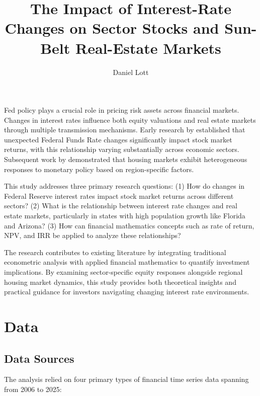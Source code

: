 \documentclass[12pt, stu, abstract]{apa7}
\title{The Impact of Interest-Rate Changes on Sector Stocks and Sun-Belt Real-Estate Markets}
\author{Daniel Lott}
\begin{document}
\maketitle

Fed policy plays a crucial role in pricing risk assets across financial markets. Changes in interest rates influence both equity valuations and real estate markets through multiple transmission mechanisms. Early research by \textcite{bernanke2005} established that unexpected Federal Funds Rate changes significantly impact stock market returns, with this relationship varying substantially across economic sectors. Subsequent work by \textcite{giuliodori2005} demonstrated that housing markets exhibit heterogeneous responses to monetary policy based on region-specific factors.

This study addresses three primary research questions: (1) How do changes in Federal Reserve interest rates impact stock market returns across different sectors? (2) What is the relationship between interest rate changes and real estate markets, particularly in states with high population growth like Florida and Arizona? (3) How can financial mathematics concepts such as rate of return, NPV, and IRR be applied to analyze these relationships?

The research contributes to existing literature by integrating traditional econometric analysis with applied financial mathematics to quantify investment implications. By examining sector-specific equity responses alongside regional housing market dynamics, this study provides both theoretical insights and practical guidance for investors navigating changing interest rate environments.

\section{Data}
\subsection{Data Sources}
The analysis relied on four primary types of financial time series data spanning from 2006 to 2025:
\end{document}
